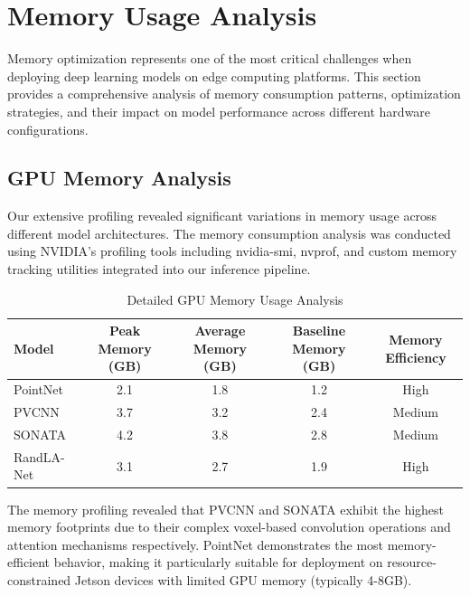 \documentclass[12pt,a4paper]{report}
\begin{document}
\section{Memory Usage Analysis}

Memory optimization represents one of the most critical challenges when deploying deep learning models on edge computing platforms. This section provides a comprehensive analysis of memory consumption patterns, optimization strategies, and their impact on model performance across different hardware configurations.

\subsection{GPU Memory Analysis}

Our extensive profiling revealed significant variations in memory usage across different model architectures. The memory consumption analysis was conducted using NVIDIA's profiling tools including nvidia-smi, nvprof, and custom memory tracking utilities integrated into our inference pipeline.

\begin{table}[htbp]
\centering
\caption{Detailed GPU Memory Usage Analysis}
\label{tab:memory_usage}
\begin{tabular}{@{}lcccc@{}}
\toprule
Model & Peak Memory (GB) & Average Memory (GB) & Baseline Memory (GB) & Memory Efficiency \\
\midrule
PointNet & 2.1 & 1.8 & 1.2 & High \\
PVCNN & 3.7 & 3.2 & 2.4 & Medium \\
SONATA & 4.2 & 3.8 & 2.8 & Medium \\
RandLA-Net & 3.1 & 2.7 & 1.9 & High \\
\bottomrule
\end{tabular}
\end{table}

The memory profiling revealed that PVCNN and SONATA exhibit the highest memory footprints due to their complex voxel-based convolution operations and attention mechanisms respectively. PointNet demonstrates the most memory-efficient behavior, making it particularly suitable for deployment on resource-constrained Jetson devices with limited GPU memory (typically 4-8GB).
\end{document}
